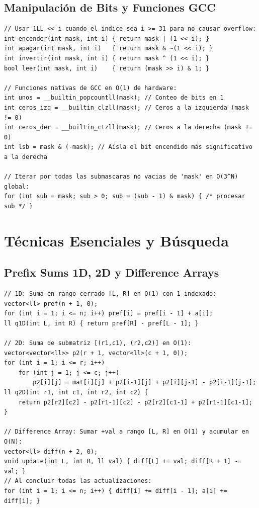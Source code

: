 \documentclass[9pt,twocolumn,a4paper]{extarticle}
\begin{document}
\subsection{Manipulación de Bits y Funciones GCC}
\begin{lstlisting}
// Usar 1LL << i cuando el indice sea i >= 31 para no causar overflow:
int encender(int mask, int i) { return mask | (1 << i); }
int apagar(int mask, int i)   { return mask & ~(1 << i); }
int invertir(int mask, int i) { return mask ^ (1 << i); }
bool leer(int mask, int i)    { return (mask >> i) & 1; }

// Funciones nativas de GCC en O(1) de hardware:
int unos = __builtin_popcountll(mask); // Conteo de bits en 1
int ceros_izq = __builtin_clzll(mask); // Ceros a la izquierda (mask != 0)
int ceros_der = __builtin_ctzll(mask); // Ceros a la derecha (mask != 0)
int lsb = mask & (-mask); // Aísla el bit encendido más significativo a la derecha

// Iterar por todas las submascaras no vacias de 'mask' en O(3^N) global:
for (int sub = mask; sub > 0; sub = (sub - 1) & mask) { /* procesar sub */ }
\end{lstlisting}

\section{Técnicas Esenciales y Búsqueda}
\subsection{Prefix Sums 1D, 2D y Difference Arrays}
\begin{lstlisting}
// 1D: Suma en rango cerrado [L, R] en O(1) con 1-indexado:
vector<ll> pref(n + 1, 0);
for (int i = 1; i <= n; i++) pref[i] = pref[i - 1] + a[i];
ll q1D(int L, int R) { return pref[R] - pref[L - 1]; }

// 2D: Suma de submatriz [(r1,c1), (r2,c2)] en O(1):
vector<vector<ll>> p2(r + 1, vector<ll>(c + 1, 0));
for (int i = 1; i <= r; i++)
    for (int j = 1; j <= c; j++)
        p2[i][j] = mat[i][j] + p2[i-1][j] + p2[i][j-1] - p2[i-1][j-1];
ll q2D(int r1, int c1, int r2, int c2) {
    return p2[r2][c2] - p2[r1-1][c2] - p2[r2][c1-1] + p2[r1-1][c1-1];
}

// Difference Array: Sumar +val a rango [L, R] en O(1) y acumular en O(N):
vector<ll> diff(n + 2, 0);
void update(int L, int R, ll val) { diff[L] += val; diff[R + 1] -= val; }
// Al concluir todas las actualizaciones:
for (int i = 1; i <= n; i++) { diff[i] += diff[i - 1]; a[i] += diff[i]; }
\end{lstlisting}
\end{document}
